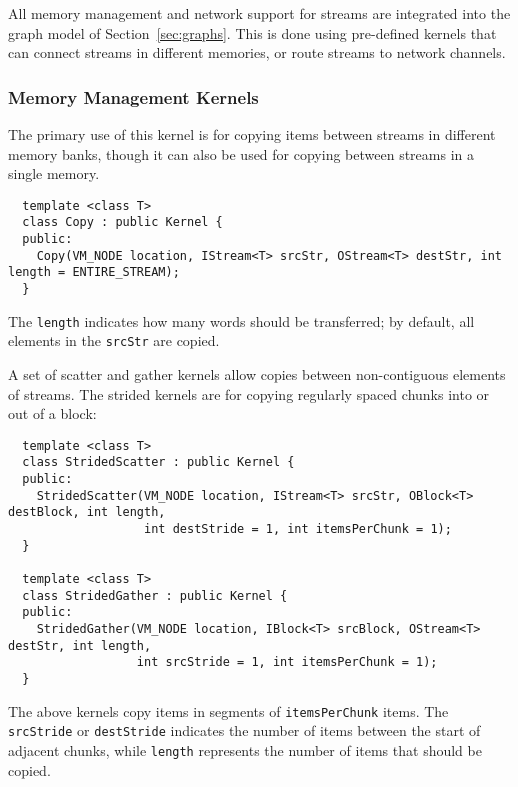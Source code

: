 \label{sec:predef}

All memory management and network support for streams are integrated
into the graph model of Section~\ref{sec:graphs}.  This is done
using pre-defined kernels that can connect streams in different
memories, or route streams to network channels.

\subsubsection*{Memory Management Kernels}

 The primary use of this kernel is for copying items
between streams in different memory banks, though it can also be used
for copying between streams in a single memory.
{\small
\begin{verbatim}
  template <class T>
  class Copy : public Kernel {
  public:
    Copy(VM_NODE location, IStream<T> srcStr, OStream<T> destStr, int length = ENTIRE_STREAM);
  }
\end{verbatim}}
The {\tt length} indicates how many words should be transferred; by
default, all elements in the {\tt srcStr} are copied.

 A set of scatter and gather kernels allow copies
between non-contiguous elements of streams.  The strided kernels are
for copying regularly spaced chunks into or out of a block:
{\small
\begin{verbatim}
  template <class T>
  class StridedScatter : public Kernel {
  public:
    StridedScatter(VM_NODE location, IStream<T> srcStr, OBlock<T> destBlock, int length,
                   int destStride = 1, int itemsPerChunk = 1);
  }

  template <class T>
  class StridedGather : public Kernel {
  public:
    StridedGather(VM_NODE location, IBlock<T> srcBlock, OStream<T> destStr, int length,
                  int srcStride = 1, int itemsPerChunk = 1);
  }  
\end{verbatim}}
The above kernels copy items in segments of {\tt itemsPerChunk} items.
The {\tt srcStride} or {\tt destStride} indicates the number of items
between the start of adjacent chunks, while {\tt length} represents
the number of items that should be copied.


